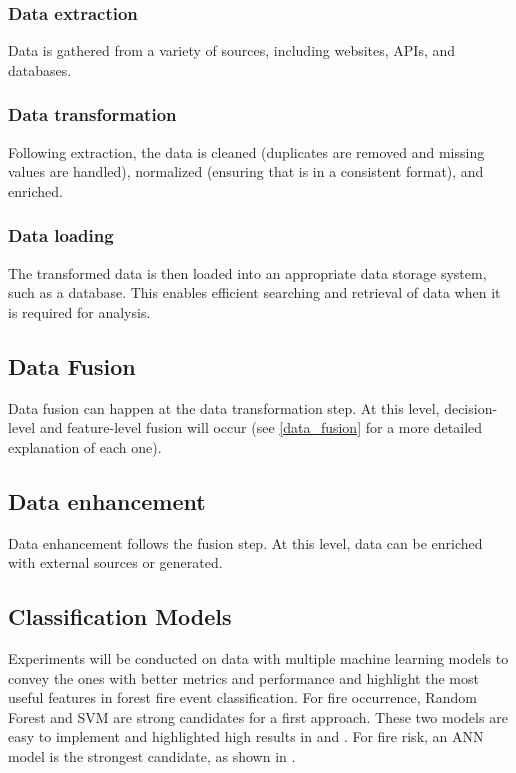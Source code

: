 \subsubsection{Data extraction}
Data is gathered from a variety of sources, including websites, APIs, and databases.

\subsubsection{Data transformation}
Following extraction, the data is cleaned (duplicates are removed and missing values are handled), normalized (ensuring that is in a consistent format), and enriched. 

\subsubsection{Data loading}
The transformed data is then loaded into an appropriate data storage system, such as a database. This enables efficient searching and retrieval of data when it is required for analysis.

\subsection{Data Fusion}
Data fusion can happen at the data transformation step. At this level, decision-level and feature-level fusion will occur (see \ref{data_fusion} for a more detailed explanation of each one).

\subsection{Data enhancement}
Data enhancement follows the fusion step. At this level, data can be enriched with external sources or generated.


\subsection{Classification Models}
Experiments will be conducted on data with multiple machine learning models to convey the ones with better metrics and performance and highlight the most useful features in forest fire event classification. For fire occurrence, Random Forest and SVM are strong candidates for a first approach. These two models are easy to implement and highlighted high results in \cite{9726029} and \cite{SAYAD2019130}. For fire risk, an ANN model is the strongest candidate, as shown in \cite{rs13132513}.

